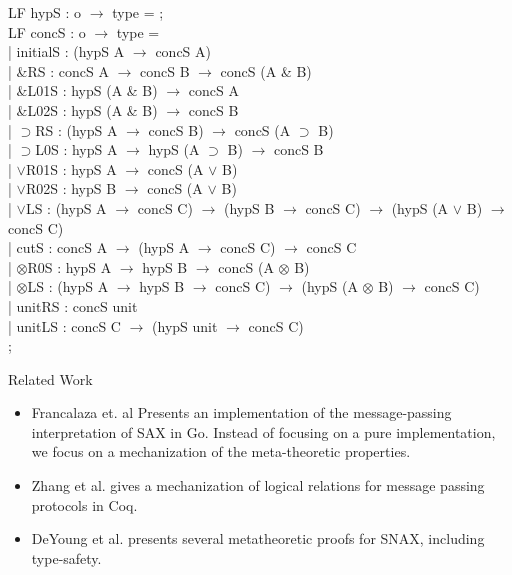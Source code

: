 \documentclass[9ps]{beamer}
\begin{document}
\begin{frame}
  \scriptsize
\ttfamily

LF hypS : o $\to$ type = ;\\
LF concS : o $\to$ type =\\[4pt]

\quad | initialS : (hypS A $\to$ concS A)\\
\quad | \&RS : concS A $\to$ concS B $\to$ concS (A \& B)\\
\quad | \&L01S : hypS (A \& B) $\to$ concS A\\
\quad | \&L02S : hypS (A \& B) $\to$ concS B\\
\quad | $\supset$RS : (hypS A $\to$ concS B) $\to$ concS (A $\supset$ B)\\
\quad | $\supset$L0S : hypS A $\to$ hypS (A $\supset$ B) $\to$ concS B\\
\quad | $\vee$R01S : hypS A $\to$ concS (A $\vee$ B)\\
\quad | $\vee$R02S : hypS B $\to$ concS (A $\vee$ B)\\
\quad | $\vee$LS : (hypS A $\to$ concS C) $\to$ (hypS B $\to$ concS C) $\to$ (hypS (A $\vee$ B) $\to$ concS C)\\
\quad | cutS : concS A $\to$ (hypS A $\to$ concS C) $\to$ concS C\\
\quad | $\otimes$R0S : hypS A $\to$ hypS B $\to$ concS (A $\otimes$ B)\\
\quad | $\otimes$LS : (hypS A $\to$ hypS B $\to$ concS C) $\to$ (hypS (A $\otimes$ B) $\to$ concS C)\\
\quad | unitRS : concS unit\\
\quad | unitLS : concS C $\to$ (hypS unit $\to$ concS C)\\
;
\end{frame}
\begin{frame} {Related Work}
    \begin{itemize}
        \item Francalaza et. al\cite{FrancalanzaTP24} Presents an implementation of the message-passing interpretation of SAX in Go. Instead of focusing on a pure implementation, we focus on a mechanization of the meta-theoretic properties.
        \item Zhang et al.\cite{zhang2025} gives a mechanization of logical relations for message passing protocols in Coq.
        \item DeYoung et al.\cite{DeYoungP23} presents several metatheoretic proofs for SNAX, including type-safety.
    \end{itemize}

\end{frame}
\end{document}

